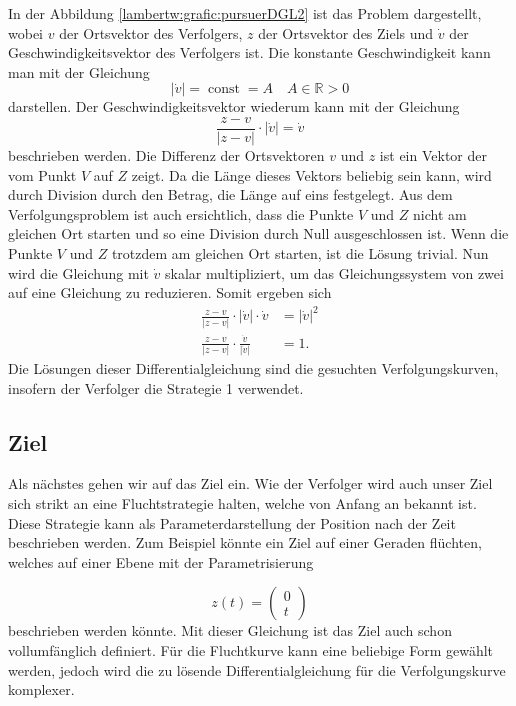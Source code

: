 In der Abbildung \ref{lambertw:grafic:pursuerDGL2} ist das Problem dargestellt,
wobei $v$ der Ortsvektor des Verfolgers, $z$ der Ortsvektor des Ziels und $\dot{v}$ der Geschwindigkeitsvektor des Verfolgers ist.
Die konstante Geschwindigkeit kann man mit der Gleichung
\begin{equation}
    |\dot{v}|
    = \operatorname{const} = A
    \quad A\in\mathbb{R}>0
\end{equation}
darstellen. Der Geschwindigkeitsvektor wiederum kann mit der Gleichung
\begin{equation}
    \frac{z-v}{|z-v|}\cdot|\dot{v}|
    =
    \dot{v}
\end{equation}
beschrieben werden.
Die Differenz der Ortsvektoren $v$ und $z$ ist ein Vektor der vom Punkt $V$ auf $Z$ zeigt.
Da die Länge dieses Vektors beliebig sein kann, wird durch Division durch den Betrag, die Länge auf eins festgelegt.
Aus dem Verfolgungsproblem ist auch ersichtlich, dass die Punkte $V$ und $Z$ nicht am gleichen Ort starten und so eine Division durch Null ausgeschlossen ist.
Wenn die Punkte $V$ und $Z$ trotzdem am gleichen Ort starten, ist die Lösung trivial.
Nun wird die Gleichung mit $\dot{v}$ skalar multipliziert, um das Gleichungssystem von zwei auf eine Gleichung zu reduzieren. Somit ergeben sich
\begin{align}
    \frac{z-v}{|z-v|}\cdot|\dot{v}|\cdot\dot{v}
    &=
    |\dot{v}|^2
    \\
    \label{lambertw:pursuerDGL}
    \frac{z-v}{|z-v|}\cdot \frac{\dot{v}}{|\dot{v}|}
    &=
    1 \text{.}
\end{align}
Die Lösungen dieser Differentialgleichung sind die gesuchten Verfolgungskurven, insofern der Verfolger die Strategie 1 verwendet.
%
\subsection{Ziel
\label{lambertw:subsection:Ziel}}
Als nächstes gehen wir auf das Ziel ein.
Wie der Verfolger wird auch unser Ziel sich strikt an eine Fluchtstrategie halten, welche von Anfang an bekannt ist.
Diese Strategie kann als Parameterdarstellung der Position nach der Zeit beschrieben werden.
Zum Beispiel könnte ein Ziel auf einer Geraden flüchten, welches auf einer Ebene mit der Parametrisierung

\begin{equation}
    z(t)
    =
    \left( \begin{array}{c} 0 \\  t \end{array} \right)
\end{equation}
%
beschrieben werden könnte.
Mit dieser Gleichung ist das Ziel auch schon vollumfänglich definiert.
Für die Fluchtkurve kann eine beliebige Form gewählt werden, jedoch wird die zu lösende Differentialgleichung für die Verfolgungskurve komplexer.




